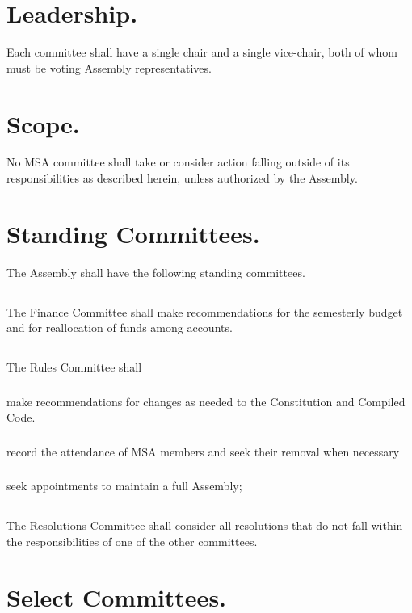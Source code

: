 \documentclass{rules}
\begin{document}
\section{Leadership.}
Each committee shall have a single chair and a single vice-chair, both of whom must be voting Assembly representatives. 

\section{Scope.}
No MSA committee shall take or consider action falling outside of its responsibilities as described herein, unless authorized by the Assembly.

\section{Standing Committees.}
The Assembly shall have the following standing committees.
\subsection{}
The Finance Committee shall make recommendations for the semesterly budget and for reallocation of funds among accounts.
\subsection{}
The Rules Committee shall
\subsubsection{}
make recommendations for changes as needed to the Constitution and Compiled Code.
\subsubsection{}
record the attendance of MSA members and seek their removal when necessary
\subsubsection{}
seek appointments to maintain a full Assembly;
\subsection{}
The Resolutions Committee shall consider all resolutions that do not fall within the responsibilities of one of the other committees.


\section{Select Committees.}
\end{document}
